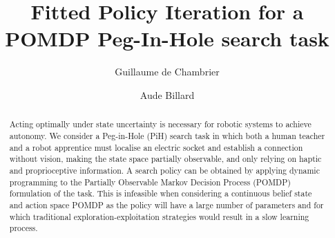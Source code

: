 \documentclass[final,5p,times,twocolumn]{elsarticle}
\begin{document}
\begin{frontmatter}



\title{Fitted Policy Iteration for a POMDP Peg-In-Hole search task}



\author[rvt]{Guillaume de Chambrier}

\author[rvt]{Aude Billard}


\address[rvt]{Learning Algorithms and Systems Laboratory (LASA), \'Ecole Polytechnique F\'ed\'erale de Lausanne (EPFL), Switzerland}

\address{}


\begin{abstract}

Acting optimally under state uncertainty  is necessary  for robotic systems to achieve autonomy.
We consider a Peg-in-Hole (PiH) search task in which both a human teacher and a robot apprentice must localise an electric socket 
and establish a connection without vision, making the state space partially observable, and only relying on haptic and 
proprioceptive information. A search policy can be obtained by applying dynamic programming to the Partially Observable 
Markov Decision Process (POMDP) formulation of the task. This is infeasible when considering a continuous belief state and 
action space POMDP as the policy will have a large number of parameters and for which traditional 
exploration-exploitation strategies would result in a slow learning process. 


\end{abstract}
\end{frontmatter}
\end{document}
